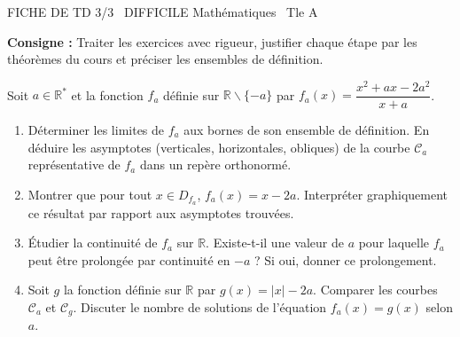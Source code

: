 \documentclass[11pt]{article}
\def\setminus{\mathbin{\backslash}}\let\smallsetminus\setminus
\begin{document}
\begin{tcolorbox}[enhanced,colback=popink,colframe=popink,arc=10pt,boxrule=0pt,left=12pt,right=12pt,top=9pt,bottom=9pt]
{\color{white}\popxbold\small FICHE DE TD 3/3 \textbullet\ DIFFICILE \hfill Mathématiques \textbullet\ Tle A\par}
\end{tcolorbox}
\vspace{4pt}
\noindent\textbf{Consigne :} Traiter les exercices avec rigueur, justifier chaque étape par les théorèmes du cours et préciser les ensembles de définition.

\begin{exercice}
Soit $a \in \mathbb{R}^*$ et la fonction $f_a$ définie sur $\mathbb{R} \setminus \{-a\}$ par $f_a(x) = \dfrac{x^2 + ax - 2a^2}{x + a}$.
\begin{enumerate}
    \item Déterminer les limites de $f_a$ aux bornes de son ensemble de définition. En déduire les asymptotes (verticales, horizontales, obliques) de la courbe $\mathcal{C}_a$ représentative de $f_a$ dans un repère orthonormé.
    \item Montrer que pour tout $x \in D_{f_a}$, $f_a(x) = x - 2a$. Interpréter graphiquement ce résultat par rapport aux asymptotes trouvées.
    \item Étudier la continuité de $f_a$ sur $\mathbb{R}$. Existe-t-il une valeur de $a$ pour laquelle $f_a$ peut être prolongée par continuité en $-a$ ? Si oui, donner ce prolongement.
    \item Soit $g$ la fonction définie sur $\mathbb{R}$ par $g(x) = |x| - 2a$. Comparer les courbes $\mathcal{C}_a$ et $\mathcal{C}_g$. Discuter le nombre de solutions de l'équation $f_a(x) = g(x)$ selon $a$.
\end{enumerate}
\end{exercice}
\end{document}
